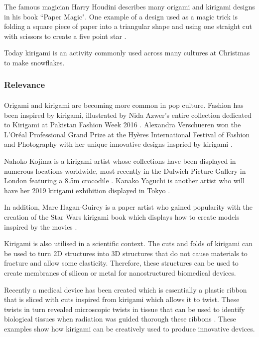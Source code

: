 \documentclass[11pt]{article}
\begin{document}
           The famous magician Harry Houdini describes many origami and kirigami designs in his book ``Paper Magic". One example of a design used as a magic trick is folding a square piece of paper into a triangular shape and using one straight cut with scissors to create a five point star \cite{PaperMagic}.
           
           Today kirigami is an activity commonly used across many cultures at Christmas to make snowflakes.
            \subsubsection{Relevance}
                \paragraph{}
                Origami and kirigami are becoming more common in pop culture. Fashion has been inspired by kirigami, illustrated by Nida Azwer's entire collection dedicated to Kirigami at Pakistan Fashion Week 2016 \cite{NidaAzwer}.
                Alexandra Verschueren won the L'Oréal Professional Grand Prize at the Hyères International Festival of Fashion and Photography with her unique innovative designs inspried by kirigami \cite{AlexandraVerschueren}.
                
                Nahoko Kojima is a kirigami artist whose collections have been displayed in numerous locations worldwide, most recently in the Dulwich Picture Gallery in London featuring a 8.5m crocodile \cite{NahokoKojima}.
                Kanako Yaguchi is another artist who will have her 2019 kirigami exhibition displayed in Tokyo \cite{KanakoYaguchi}.
                
                In addition, Marc Hagan-Guirey is a paper artist who gained popularity with the creation of the Star Wars kirigami book which displays how to create models inspired by the movies \cite{StarWars}.
            
                Kirigami is also utilised in a scientific context. The cuts and folds of kirigami can be used to turn 2D structures into 3D structures that do not cause materials to fracture and allow some elasticity. Therefore, these structures can be used to create membranes of silicon or metal for nanostructured biomedical devices.\cite{MedicalTextures}
                
               Recently a medical device has been created which is essentially a  plastic ribbon that is sliced with cuts inspired from kirigami which allows it to twist. These twists in turn revealed microscopic twists in tissue that can be used to identify biological tissues when radiation was guided thorough these ribbons \cite{MedicalDevice}.
               These examples show how kirigami can be creatively used to produce innovative devices.
               
\end{document}
